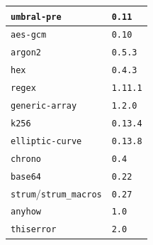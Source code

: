 \documentclass[bahasa, 12pt, a4paper, onecolumn, oneside, final]{report}
\begin{document}
\begin{longtable}{|>{\raggedright\arraybackslash}p{}|>{\raggedright\arraybackslash}p{}|}
	\texttt{umbral-pre}                   & \texttt{0.11}             \\ \hline
	\texttt{aes-gcm}                      & \texttt{0.10}             \\ \hline
	\texttt{argon2}                       & \texttt{0.5.3}            \\ \hline
	\texttt{hex}                          & \texttt{0.4.3}            \\ \hline
	\texttt{regex}                        & \texttt{1.11.1}           \\ \hline
	\texttt{generic-array}                & \texttt{1.2.0}            \\ \hline
	\texttt{k256}                         & \texttt{0.13.4}           \\ \hline
	\texttt{elliptic-curve}               & \texttt{0.13.8}           \\ \hline
	\texttt{chrono}                       & \texttt{0.4}              \\ \hline
	\texttt{base64}                       & \texttt{0.22}             \\ \hline
	\texttt{strum}/\texttt{strum\_macros} & \texttt{0.27}             \\ \hline
	\texttt{anyhow}                       & \texttt{1.0}              \\ \hline
	\texttt{thiserror}                    & \texttt{2.0}              \\ \hline
\end{longtable}
\end{document}
